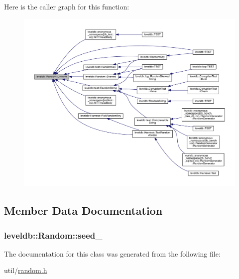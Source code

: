 Here is the caller graph for this function\+:
\nopagebreak
\begin{figure}[H]
\begin{center}
\leavevmode
\includegraphics[width=350pt]{classleveldb_1_1_random_a9281323c3f115fa47a0f329f72ad2a80_icgraph}
\end{center}
\end{figure}




\subsection{Member Data Documentation}
\hypertarget{classleveldb_1_1_random_a3c5826dd8f93dcf0eabfa4de78a2840a}{}
\subsubsection[{seed\+\_\+}]{ leveldb\+::\+Random\+::seed\+\_\+\hspace{0.3cm}{\ttfamily [private]}}\label{classleveldb_1_1_random_a3c5826dd8f93dcf0eabfa4de78a2840a}


The documentation for this class was generated from the following file\+:\begin{DoxyCompactItemize}
\item 
util/\hyperlink{random_8h}{random.\+h}\end{DoxyCompactItemize}
